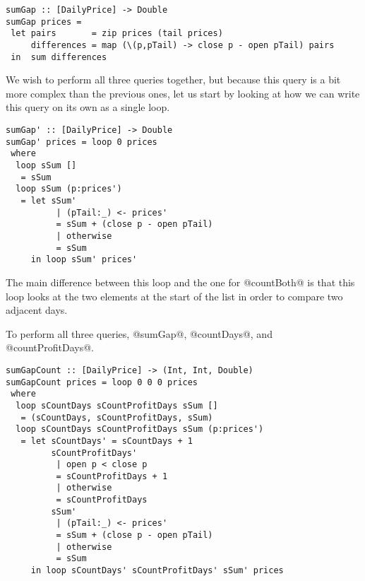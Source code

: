 \begin{lstlisting}
sumGap :: [DailyPrice] -> Double
sumGap prices =
 let pairs       = zip prices (tail prices)
     differences = map (\(p,pTail) -> close p - open pTail) pairs
 in  sum differences
\end{lstlisting}

We wish to perform all three queries together, but because this query is a bit more complex than the previous ones, let us start by looking at how we can write this query on its own as a single loop.

\begin{lstlisting}
sumGap' :: [DailyPrice] -> Double
sumGap' prices = loop 0 prices
 where
  loop sSum []
   = sSum
  loop sSum (p:prices')
   = let sSum'
          | (pTail:_) <- prices'
          = sSum + (close p - open pTail)
          | otherwise
          = sSum
     in loop sSum' prices'
\end{lstlisting}


The main difference between this loop and the one for @countBoth@ is that this loop looks at the two elements at the start of the list in order to compare two adjacent days.

To perform all three queries, @sumGap@, @countDays@, and @countProfitDays@.

\begin{lstlisting}
sumGapCount :: [DailyPrice] -> (Int, Int, Double)
sumGapCount prices = loop 0 0 0 prices
 where
  loop sCountDays sCountProfitDays sSum []
   = (sCountDays, sCountProfitDays, sSum)
  loop sCountDays sCountProfitDays sSum (p:prices')
   = let sCountDays' = sCountDays + 1
         sCountProfitDays'
          | open p < close p
          = sCountProfitDays + 1
          | otherwise
          = sCountProfitDays
         sSum'
          | (pTail:_) <- prices'
          = sSum + (close p - open pTail)
          | otherwise
          = sSum
     in loop sCountDays' sCountProfitDays' sSum' prices
\end{lstlisting}



% 



